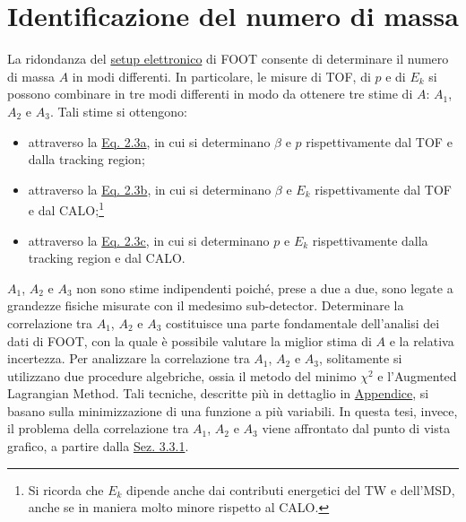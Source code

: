 \documentclass[12pt,a4paper,twoside]{report}
\begin{document}
	\section{Identificazione del numero di massa}
	La ridondanza del \hyperref[sec:setupElettronico]{setup elettronico} di FOOT consente di determinare il numero di massa $A$ in modi differenti. In particolare, le misure di TOF, di $p$ e di $E_k$ si possono combinare in tre modi differenti in modo da ottenere tre stime di $A$: $A_1$, $A_2$ e $A_3$. Tali stime si ottengono:
	\begin{itemize}
		\item attraverso la \hyperref[eq:a1]{Eq. 2.3a}, in cui si determinano $\beta$ e $p$ rispettivamente dal TOF e dalla tracking region;
		\item attraverso la \hyperref[eq:a2]{Eq. 2.3b}, in cui si determinano $\beta$ e $E_k$ rispettivamente dal TOF e dal CALO;\footnote{Si ricorda che $E_k$ dipende anche dai contributi energetici del TW e dell'MSD, anche se in maniera molto minore rispetto al CALO.}
		\item attraverso la \hyperref[eq:a3]{Eq. 2.3c}, in cui si determinano $p$ e $E_k$ rispettivamente dalla tracking region e dal CALO.
	\end{itemize}
	$A_1$, $A_2$ e $A_3$ non sono stime indipendenti poiché, prese a due a due, sono legate a grandezze fisiche misurate con il medesimo sub-detector. Determinare la correlazione tra $A_1$, $A_2$ e $A_3$ costituisce una parte fondamentale dell'analisi dei dati di FOOT, con la quale è possibile valutare la miglior stima di $A$ e la relativa incertezza. Per analizzare la correlazione tra $A_1$, $A_2$ e $A_3$, solitamente si utilizzano due procedure algebriche, ossia il metodo del minimo $\chi^2$ e l'Augmented Lagrangian Method. Tali tecniche, descritte più in dettaglio in \hyperref[cap:appendice]{Appendice}, si basano sulla minimizzazione di una funzione a più variabili. In questa tesi, invece, il problema della correlazione tra $A_1$, $A_2$ e $A_3$ viene affrontato dal punto di vista grafico, a partire dalla \hyperref[sec:correlation_number_mass]{Sez. 3.3.1}.
	
\end{document}
